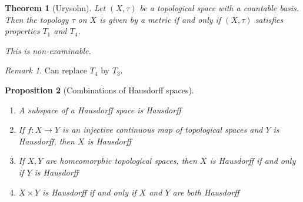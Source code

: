 \documentclass{article}
\theoremstyle{definition}
\theoremstyle{plain}%
\newtheorem{thm}{Theorem}[section]
\newtheorem{prop}[thm]{Proposition}
\theoremstyle{remark}
\newtheorem*{rem}{Remark}
\begin{document}
\begin{thm}[Urysohn]
    Let $(X,\tau)$ be a topological space with a countable basis. Then the topology $\tau$ on $X$ is given by a metric if and only if $(X, \tau)$ satisfies properties $T_1$ and $T_4$.
    
    This is non-examinable.
\end{thm}

\begin{rem}
    Can replace $T_4$ by $T_3$.
\end{rem}

\begin{prop}[Combinations of Hausdorff spaces]
    \hspace{0.1em}
    \begin{enumerate}
        \item A subspace of a Hausdorff space is Hausdorff
        \item If $f:X \to Y$ is an injective continuous map of topological spaces and $Y$ is Hausdorff, then $X$ is Hausdorff
        \item If $X,Y$ are homeomorphic topological spaces, then $X$ is Hausdorff if and only if $Y$ is Hausdorff
        \item $X \times Y$ is Hausdorff if and only if $X$ and $Y$ are both Hausdorff
    \end{enumerate}
\end{prop}
\end{document}
